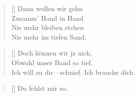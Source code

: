 \documentclass[twocolumn]{article}
\newenvironment{Strophe}{\begin{minipage}{\versewidth} \begin{verse}[\versewidth]}{\end{verse} \end{minipage}\vspace{0.5em}}
\begin{document}
	\begin{Strophe}
		Dann wollen wir gehn \\
		Zusamm' Hand in Hand \\
		Nie mehr bleiben stehen \\
		Nie mehr im tiefen Sand. \\
	\end{Strophe}
	
	\begin{Strophe}
		Doch können wir jz nich, \\
		Obwohl unser Band so tief. \\
		Ich will zu dir—schnief.
		Ich brauche dich. \\
	\end{Strophe}
	
	\begin{Strophe}
		Du fehlst mir so.
	\end{Strophe}
\end{document}
